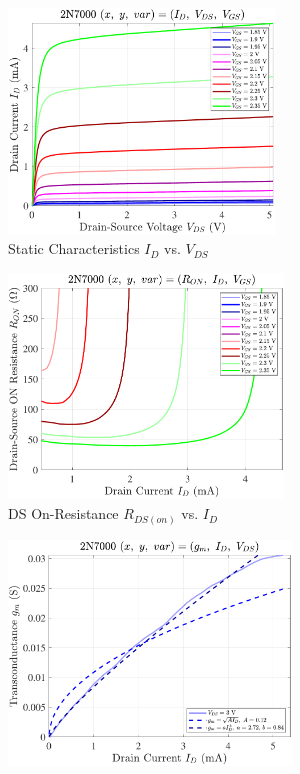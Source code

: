 \documentclass[UTF8]{article}
\begin{document}
\begin{center}
    \noindent\begin{minipage}{0.45\columnwidth}
        \begin{figure}[H]\centering
            \includegraphics[height=170pt]{LCE-04-场效应管/assets/2N7000 (NMOS) [onsemi, KH32] current level low (0~5mA)/2025-04-24_00-33-54__stc_Id_Vds_Vgs.pdf}
            \caption{Static Characteristics $I_D$ vs. $V_{DS}$}
        \end{figure}
        \begin{figure}[H]\centering
            \includegraphics[height=170pt]{LCE-04-场效应管/assets/2N7000 (NMOS) [onsemi, KH32] current level low (0~5mA)/2025-04-24_00-33-58__stc_Ron_Id_Vgs.pdf}
            \caption{DS On-Resistance $R_{DS(on)}$ vs. $I_D$}
        \end{figure}
        \begin{figure}[H]\centering
            \includegraphics[height=170pt]{LCE-04-场效应管/assets/2N7000 (NMOS) [onsemi, KH32] current level low (0~5mA)/2025-04-24_00-34-02__stc_gm_Id_Vds.pdf}

\end{figure}
\end{minipage}
\end{center}
\end{document}
